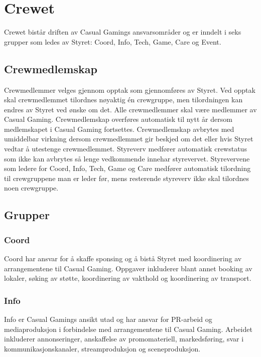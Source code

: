 \chapter{Crewet}
Crewet bistår driften av Casual Gamings ansvarsområder og er inndelt i seks grupper som ledes av Styret: Coord, Info, Tech, Game, Care og Event.

\section{Crewmedlemskap}
Crewmedlemmer velges gjennom opptak som gjennomføres av Styret. Ved opptak skal crew\-medlemmet tilordnes nøyaktig én crewgruppe, men tilordningen kan endres av Styret ved ønske om det. Alle crewmedlemmer skal være medlemmer av Casual Gaming. Crewmedlemskap overføres automatisk til nytt år dersom medlemskapet i Casual Gaming fortsettes. Crewmedlemskap avbrytes med umiddelbar virkning dersom crewmedlemmet gir beskjed om det eller hvis Styret vedtar å utestenge crewmedlemmet. Styreverv medfører automatisk crewstatus som ikke kan avbrytes så lenge vedkommende innehar styrevervet. Styrevervene som ledere for Coord, Info, Tech, Game og Care medfører automatisk tilordning til crewgruppene man er leder før, mens resterende styreverv ikke skal tilordnes noen crewgruppe.

\section{Grupper}

\emptysectionspacing

\subsection{Coord}
Coord har ansvar for å skaffe sponsing og å bistå Styret med koordinering av arrangementene til Casual Gaming. Oppgaver inkluderer blant annet booking av lokaler, søking av støtte, koordinering av vakthold og koordinering av transport.

\subsection{Info}
Info er Casual Gamings ansikt utad og har ansvar for PR-arbeid og mediaproduksjon i for\-bindelse med arrangementene til Casual Gaming. Arbeidet inkluderer annonseringer, anskaffelse av promomateriell, markedsføring, svar i kommunikasjonskanaler, streamproduksjon og sceneproduksjon.

